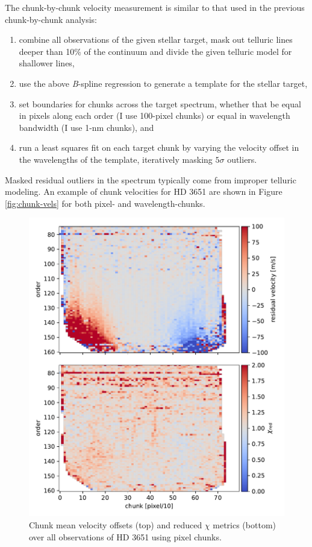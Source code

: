 The chunk-by-chunk velocity measurement is similar to that used in the previous chunk-by-chunk analysis:
\begin{enumerate}
    \item combine all observations of the given stellar target, mask out telluric lines deeper than 10\% of the continuum and divide the given telluric model for shallower lines,
    \item use the above \textit{B}-spline regression to generate a template for the stellar target,
    \item set boundaries for chunks across the target spectrum, whether that be equal in pixels along each order (I use 100-pixel chunks) or equal in wavelength bandwidth (I use 1-\si{\nano\meter} chunks), and
    \item run a least squares fit on each target chunk by varying the velocity offset in the wavelengths of the template, iteratively masking $5\sigma$ outliers.
\end{enumerate}
Masked residual outliers in the spectrum typically come from improper telluric modeling. An example of chunk velocities for HD 3651 are shown in Figure \ref{fig:chunk-vels} for both pixel- and wavelength-chunks.

\begin{figure}
    \centering
    \includegraphics[width=\textwidth]{figures-5/pixel-chunk-resid.pdf}
    \caption[Forward model chunk velocity offsets and reduced $\chi$ metrics -- pixel chunks]{Chunk mean velocity offsets (top) and reduced $\chi$ metrics (bottom) over all observations of HD 3651 using pixel chunks.}
    \label{fig:pixel-chunk-resid}
\end{figure}

